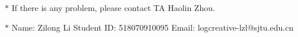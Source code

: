 \documentclass[12pt,a4paper]{article}
\theoremstyle{definition}
\begin{document}
	\noindent
	
	\noindent{}
	\begin{center}
		\footnotesize{\color{red}$*$ If there is any problem, please contact TA Haolin Zhou.}
		
		\footnotesize{\color{blue}$*$ Name: Zilong Li \quad Student ID: 518070910095 \quad Email: logcreative-lzl@sjtu.edu.cn}
		
	\end{center}
	
\end{document}
